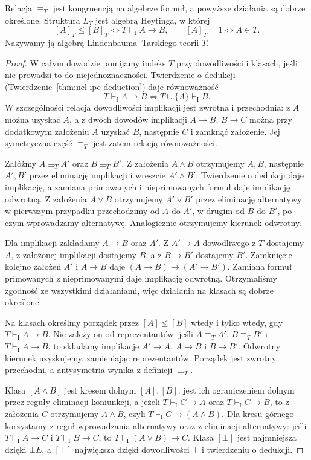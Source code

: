 \begin{twierdzenie}
\label{thm:ncl-heyting-lindenbaum}
Relacja $\equiv_T$ jest kongruencją na algebrze
formuł, a powyższe działania są dobrze określone.
Struktura $L_T$ jest algebrą Heytinga, w której
\[
 [A]_T\leq[B]_T
 \iff T\vdash_{\mathrm I}A\to B,\qquad
 [A]_T=1\iff A\in T.
\]
Nazywamy ją algebrą Lindenbauma--Tarskiego
teorii $T$.
\end{twierdzenie}
\begin{proof}
W całym dowodzie pomijamy indeks $T$ przy
dowodliwości i klasach, jeśli nie prowadzi to
do niejednoznaczności.
Twierdzenie o dedukcji
(Twierdzenie~\ref{thm:ncl-ipc-deduction})
daje równoważność
\[
 T\vdash_{\mathrm I}A\to B
 \iff T\cup\{A\}\vdash_{\mathrm I}B.
\]
W szczególności relacja dowodliwości implikacji
jest zwrotna i przechodnia: z $A$ można uzyskać
$A$, a z dwóch dowodów implikacji $A\to B$,
$B\to C$ można przy dodatkowym założeniu $A$
uzyskać $B$, następnie $C$ i zamknąć założenie.
Jej symetryczna część $\equiv_T$ jest zatem
relacją równoważności.

Załóżmy $A\equiv_T A'$ oraz $B\equiv_T B'$.
Z założenia $A\wedge B$ otrzymujemy $A,B$,
następnie $A',B'$ przez eliminację implikacji
i wreszcie $A'\wedge B'$. Twierdzenie o dedukcji
daje implikację, a zamiana primowanych
i nieprimowanych formuł daje implikację odwrotną.
Z założenia $A\vee B$ otrzymujemy $A'\vee B'$
przez eliminację alternatywy: w pierwszym
przypadku przechodzimy od $A$ do $A'$, w drugim
od $B$ do $B'$, po czym wprowadzamy alternatywę.
Analogicznie otrzymujemy kierunek odwrotny.

Dla implikacji zakładamy $A\to B$ oraz $A'$.
Z $A'\to A$ dowodliwego z $T$ dostajemy $A$,
z założonej implikacji dostajemy $B$,
a z $B\to B'$ dostajemy $B'$.
Zamknięcie kolejno założeń $A'$ i $A\to B$
daje $(A\to B)\to(A'\to B')$.
Zamiana formuł primowanych z nieprimowanymi
daje implikację odwrotną. Otrzymaliśmy zgodność
ze wszystkimi działaniami, więc działania
na klasach są dobrze określone.

Na klasach określmy porządek przez
$[A]\leq[B]$ wtedy i tylko wtedy, gdy
$T\vdash_{\mathrm I}A\to B$.
Nie zależy on od reprezentantów: jeśli
$A\equiv_T A'$, $B\equiv_T B'$ i
$T\vdash_{\mathrm I}A\to B$, to składamy
implikacje $A'\to A$, $A\to B$ i $B\to B'$.
Odwrotny kierunek uzyskujemy, zamieniając
reprezentantów. Porządek jest zwrotny,
przechodni, a antysymetria wynika z definicji
$\equiv_T$.

Klasa $[A\wedge B]$ jest kresem dolnym $[A],[B]$:
jest ich ograniczeniem dolnym przez reguły
eliminacji koniunkcji, a jeżeli
$T\vdash_{\mathrm I}C\to A$ oraz
$T\vdash_{\mathrm I}C\to B$, to z założenia $C$
otrzymujemy $A\wedge B$, czyli
$T\vdash_{\mathrm I}C\to(A\wedge B)$.
Dla kresu górnego korzystamy z reguł wprowadzania
alternatywy oraz z eliminacji alternatywy:
jeśli $T\vdash_{\mathrm I}A\to C$ i
$T\vdash_{\mathrm I}B\to C$, to
$T\vdash_{\mathrm I}(A\vee B)\to C$.
Klasa $[\bot]$ jest najmniejsza dzięki $\bot E$,
a $[\top]$ największa dzięki dowodliwości $\top$
i twierdzeniu o dedukcji.


\end{proof}
